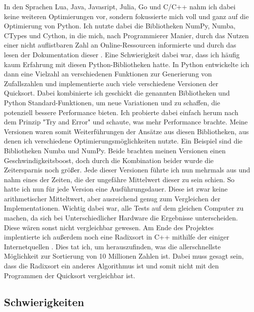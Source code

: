 \documentclass[10pt,a4paper]{article}
\begin{document}
In den Sprachen Lua, Java, Javasript, Julia, Go und C/C++ nahm ich dabei keine weiteren Optimierungen vor,
sondern fokussierte mich voll und ganz auf die Optimierung von Python.
Ich nutzte dabei die Bibliotheken NumPy, Numba, CTypes und Cython, in die mich, nach Programmierer
Manier, durch das Nutzen einer nicht auflistbaren Zahl an Online-Ressourcen informierte und
durch das lesen der Dokumentation dieser \cite{cythondocs} \cite{cythondocsnumpy} \cite{cythonctypes}.
Eine Schwierigkeit dabei war, dass ich häufig kaum Erfahrung mit diesen Python-Bibliotheken hatte.
In Python entwickelte ich dann eine Vielzahl an verschiedenen Funktionen zur Generierung von Zufallszahlen
und implementierte auch viele verschiedene Versionen der Quicksort. Dabei kombinierte ich geschickt die
genannten Bibliotheken und Python Standard-Funktionen, um neue Variationen und zu schaffen,
die potenziell bessere Performance bieten.
Ich probierte dabei einfach herum nach dem Prinzip "Try and Error" und schaute, was mehr Performance brachte.
Meine Versionen waren somit Weiterführungen der Ansätze aus diesen Bibliotheken, aus denen ich
verschiedene Optimierungsmöglichkeiten nutzte.
Ein Beispiel sind die Bibliotheken Numba und NumPy. Beide brachten meinen Versionen einen
Geschwindigkeitsboost, doch durch die Kombination beider wurde die Zeitersparnis noch größer.
Jede dieser Versionen führte ich nun mehrmals aus und nahm eines der Zeiten, die der ungefähre
Mittelwert dieser zu sein schien. So hatte ich nun für jede Version eine Ausführungsdauer.
Diese ist zwar keine arithmetischer Mitteltwert, aber ausreichend genug zum Vergleichen
der Implementationen. Wichtig dabei war, alle Tests auf dem gleichen Computer zu machen,
da sich bei Unterschiedlicher Hardware
die Ergebnisse unterscheiden. Diese wären sonst nicht vergleichbar gewesen.
Am Ende des Projektes implentierte ich außerdem noch eine Radixsort in C++ mithilfe der
einiger Internetquellen \cite{terdiman} \cite{michael} \cite{intelavxdocs} \cite{avxguide}.
Dies tat ich, um herauszufinden, was die allerschnellste Möglichkeit zur Sortierung von 10 Millionen
Zahlen ist. Dabei muss gesagt sein, dass die Radixsort ein anderes
Algorithmus ist und somit nicht mit den Programmen der Quicksort vergleichbar ist.

\subsection{Schwierigkeiten}
\end{document}
